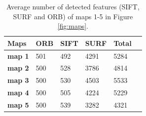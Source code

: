 \begin{table}[H]
\centering
\caption{Average number of detected features (SIFT, SURF and ORB) of maps 1-5 in Figure \ref{fig:maps}.}
\begin{tabular}{ | m{3em} | m{2cm} | m{1.5cm} | m{1.5cm} | m{1.5cm} | m{3cm} | } 
\hline
\textbf{Maps} & \textbf{ORB}  & \textbf{SIFT} & \textbf{SURF} & \textbf{Total}\\ 
\hline
\textbf{map 1}  & 501 & 492 & 4291 & 5284 \\ 
\hline
\textbf{map 2}  & 500 & 528 & 3786 & 4814 \\ 
\hline
\textbf{map 3}  & 500 & 530 & 4503 & 5533 \\ 
\hline 
\textbf{map 4}  & 500 & 505 & 4224 & 5229 \\ 
\hline 
\textbf{map 5}  & 500 & 539 & 3282 & 4321 \\ 
\hline 
\end{tabular}
\label{table:numfeatures}
\end{table}


